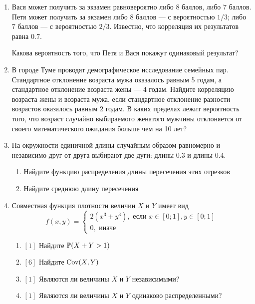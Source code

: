 \documentclass[12pt, a4paper]{article}\usepackage[]{graphicx}\usepackage[]{color}
\begin{document}
\begin{enumerate}
\item Вася может получить за экзамен равновероятно либо $8$ баллов, либо $7$ баллов. Петя может получить за экзамен либо $8$ баллов — с вероятностью $1/3$; либо $7$ баллов — с вероятностью $2/3$. Известно, что корреляция их результатов равна $0.7$.

Какова вероятность того, что Петя и Вася покажут одинаковый результат?

\item В  городе Туме проводят демографическое исследование семейных пар. Стандартное отклонение возраста мужа оказалось равным 5 годам, а стандартное отклонение возраста жены — 4 годам. Найдите корреляцию возраста жены и возраста мужа, если стандартное отклонение разности возрастов оказалось равным 2 годам. В каких пределах лежит вероятность того, что возраст случайно выбираемого женатого мужчины отклоняется от своего математического ожидания больше чем на 10 лет?


\item На окружности единичной длины случайным образом равномерно и независимо друг от друга выбирают две дуги: длины $0.3$ и длины $0.4$.
\begin{enumerate}
\item  Найдите функцию распределения длины пересечения этих отрезков
\item Найдите среднюю длину пересечения
\end{enumerate}


\item  Совместная функция плотности величин $X$ и $Y$ имеет вид
\begin{equation}
\nonumber
f(x,y)=\begin{cases}
2(x^3+y^3), \text{ если } x\in [0;1], y\in [0;1] \\
0, \mbox{ иначе}
\end{cases}
\end{equation}
\begin{enumerate}
\item $[1]$ Найдите $\P(X+Y>1)$
\item $[6]$ Найдите $\Cov(X,Y)$
\item $[1]$ Являются ли величины $X$ и $Y$ независимыми?
\item $[1]$ Являются ли величины $X$ и $Y$ одинаково распределенными?
\end{enumerate}




\end{enumerate}
\end{document}
